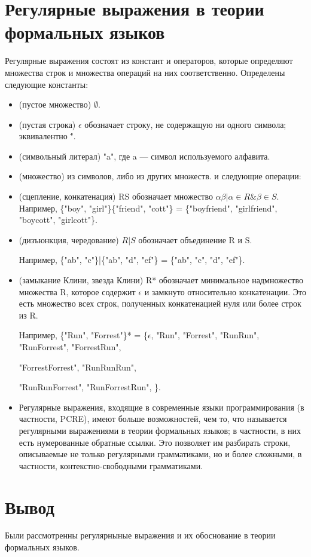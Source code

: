 \documentclass[12pt]{report}
\begin{document}
\section{Регулярные выражения в теории формальных языков}
Регулярные выражения состоят из констант и операторов, которые определяют множества строк и множества операций на них соответственно. Определены следующие константы:
\begin{itemize}
\item (пустое множество) $\emptyset$.
\item (пустая строка) $\epsilon$ обозначает строку, не содержащую ни одного символа; эквивалентно \"".
\item (символьный литерал) "a", где a — символ используемого алфавита.
\item (множество) из символов, либо из других множеств.
и следующие операции:
\end{itemize}
\begin{itemize}
	\item (сцепление, конкатенация) RS обозначает множество ${\alpha\beta | \alpha \in R  \& \beta \in S}$. Например, \{"boy", "girl"\}\{"friend", "cott"\} = \{"boyfriend", "girlfriend", "boycott", "girlcott"\}.
	\item(дизъюнкция, чередование) $R|S$ обозначает объединение R и S.
	
	 Например, \{"ab", "c"\}|\{"ab", "d", "ef"\} = \{"ab", "c", "d", "ef"\}.
	\item(замыкание Клини, звезда Клини) R* обозначает минимальное надмножество множества R, которое содержит $\epsilon$ и замкнуто относительно конкатенации. Это есть множество всех строк, полученных конкатенацией нуля или более строк из R.
	
	 Например, \{"Run", "Forrest"\}* = \{$\epsilon$, "Run", "Forrest", "RunRun", "RunForrest", "ForrestRun",
	 
	  "ForrestForrest", "RunRunRun",
	
	 "RunRunForrest", "RunForrestRun", \}.
	\item Регулярные выражения, входящие в современные языки программирования (в частности, PCRE), имеют больше возможностей, чем то, что называется регулярными выражениями в теории формальных языков; в частности, в них есть нумерованные обратные ссылки. Это позволяет им разбирать строки, описываемые не только регулярными грамматиками, но и более сложными, в частности, контекстно-свободными грамматиками.
\end{itemize}
\section{Вывод}
Были рассмотренны регулярныные выражения и их обоснование в теории формальных языков.
\end{document}
